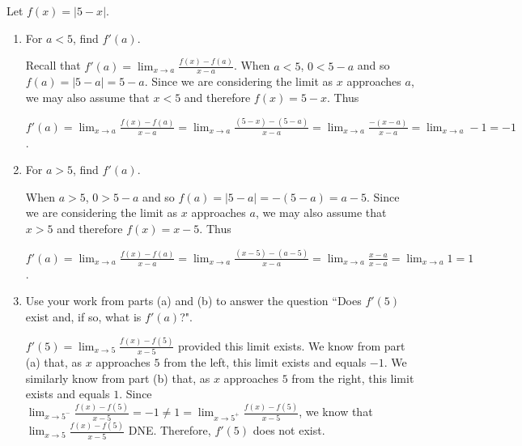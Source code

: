 \documentclass[nooutcomes]{ximera}
\begin{document}
\begin{problem}
Let $f(x) = |5-x|$.
	
	\begin{enumerate}
	
	\item For $a < 5$, find $f'(a)$.
	
		\begin{freeResponse}
		Recall that $f'(a) = \lim_{x \to a} \frac{f(x) - f(a)}{x-a}$.  When $a < 5$, $0 < 5-a$ and so $f(a) = |5-a| = 5-a$.  Since we are considering the limit as $x$ approaches $a$, we may also assume that $x < 5$ and therefore $f(x) = 5-x$.  Thus
		
		$f'(a) = \lim_{x \to a} \frac{f(x) - f(a)}{x-a}
		= \lim_{x \to a} \frac{(5-x) - (5-a)}{x-a}
		= \lim_{x \to a} \frac{-(x-a)}{x-a}
		= \lim_{x \to a} -1 = -1$.
		\end{freeResponse}
		
		
	
	\item For $a > 5$, find $f'(a)$.
	
		\begin{freeResponse}
		When $a > 5$, $0 > 5-a$ and so $f(a) = |5-a| = -(5-a) = a-5$.  Since we are considering the limit as $x$ approaches $a$, we may also assume that $x > 5$ and therefore $f(x) = x-5$.  Thus
		
		$f'(a) = \lim_{x \to a} \frac{f(x) - f(a)}{x-a}
		= \lim_{x \to a} \frac{(x-5) - (a-5)}{x-a}
		= \lim_{x \to a} \frac{x-a}{x-a}
		= \lim_{x \to a} 1 = 1$.

		\end{freeResponse}
		
		
	
	\item Use your work from parts (a) and (b) to answer the question ``Does $f'(5)$ exist and, if so, what is $f'(a)$?".
	
		\begin{freeResponse}
		$f'(5) = \lim_{x \to 5} \frac{f(x) - f(5)}{x-5}$ provided this limit exists.  We know from part (a) that, as $x$ approaches $5$ from the left, this limit exists and equals $-1$.  We similarly know from part (b) that, as $x$ approaches $5$ from the right, this limit exists and equals $1$.  Since $\lim_{x \to 5^-} \frac{f(x) - f(5)}{x-5} = -1 \neq 1 = \lim_{x \to 5^+} \frac{f(x) - f(5)}{x-5}$, we know that $\lim_{x \to 5} \frac{f(x) - f(5)}{x-5}$ DNE.  Therefore, $f'(5)$ does not exist.
		\end{freeResponse}
		
		
	
	\end{enumerate}


\end{problem}
	
	
	
	
	
	
	
	
	

	










								
				
				
	
\end{document}

